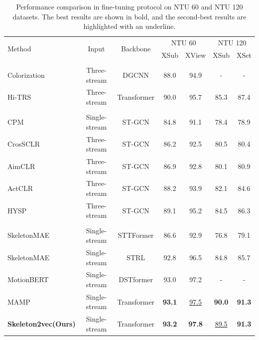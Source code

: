\begin{table}[tb]
    \caption{
      Performance comparison in fine-tuning protocol on NTU 60 and NTU 120 datasets.
      The best results are shown in bold, and the second-best results
      are highlighted with an underline.
    }
    \centering
    \setlength{\tabcolsep}{4pt} %
    \begin{tabular}{l c c c c c c}
      \toprule
      \multirow{2}{*}{Method} &
      \multirow{2}{*}{Input} &
      \multirow{2}{*}{Backbone} &
      \multicolumn{2}{c}{NTU 60} &
      \multicolumn{2}{c}{NTU 120} \\
      & & & XSub & XView & XSub & XSet \\
      \midrule
      \rowcolor{Gray!20} \multicolumn{7}{l}{\textit{Other pretext tasks:}} \\
      Colorization \cite{yang2021skeleton} & Three-stream & DGCNN & 88.0 & 94.9 & - & - \\
      Hi-TRS \cite{chen2022hierarchically} & Three-stream & Transformer & 90.0 & 95.7 & 85.3 & 87.4 \\
      \rowcolor{Gray!20} \multicolumn{7}{l}{\textit{Contrastive Learning:}} \\
      CPM \cite{zhang2022contrastive} & Single-stream & ST-GCN & 84.8 & 91.1 & 78.4 & 78.9 \\
      CrosSCLR \cite{li20213d} & Three-stream & ST-GCN & 86.2 & 92.5 & 80.5 & 80.4 \\
      AimCLR \cite{guo2022contrastive} & Three-stream & ST-GCN & 86.9 & 92.8 & 80.1 & 80.9 \\
      ActCLR \cite{lin2023actionlet} & Three-stream & ST-GCN & 88.2 & 93.9 & 82.1 & 84.6 \\
      HYSP \cite{franco2023hyperbolic} & Three-stream & ST-GCN & 89.1 & 95.2 & 84.5 & 86.3 \\
      \rowcolor{Gray!20} \multicolumn{7}{l}{\textit{Masked Prediction:}} \\
      SkeletonMAE \cite{wu2023skeletonmae} & Single-stream & STTFormer & 86.6 & 92.9 & 76.8 & 79.1 \\
      SkeletonMAE \cite{yan2023skeletonmae} & Single-stream & STRL & 92.8 & 96.5 & 84.8 & 85.7 \\
      MotionBERT \cite{zhu2023motionbert} & Single-stream & DSTformer & 93.0 & 97.2 & - & - \\
      MAMP \cite{mao2023masked} & Single-stream & Transformer & \textbf{93.1} & \underline{97.5} & \textbf{90.0} & \textbf{91.3} \\
      \midrule
      \textbf{Skeleton2vec(Ours)} & Single-stream & Transformer & \textbf{93.2} & \textbf{97.8} & \underline{89.5} & \textbf{91.3} \\
      \bottomrule
    \end{tabular}
    \label{tab:fine-tuning}
\end{table}

